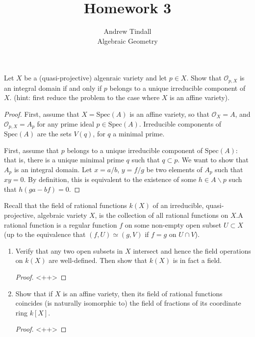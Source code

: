 \documentclass[12pt]{article}
\theoremstyle{definition}
\newenvironment{problem}[2][Problem]{\begin{trivlist}
\item[\hskip \labelsep {\bfseries #1}\hskip \labelsep {\bfseries #2.}]}{\end{trivlist}}
\begin{document}
 
 
\title{Homework 3}
\author{Andrew Tindall
\\ Algebraic Geometry}
 
\maketitle
\begin{problem}{1}
	Let $X$ be a (quasi-projective) algenraic variety and let $p \in X$. Show that $\mathcal{O}_{p,X}$ is an integral domain if and only if $p$ belongs to a unique irreducible component of $X$. (hint: first reduce the problem to the case where $X$ is an affine variety).
	\begin{proof}
		First, assume that $X = \text{Spec}(A)$ is an affine variety, so that $\mathcal O_{X}= A$, and $\mathcal O_{p, X} = A_p$ for any prime ideal $p \in \text{Spec}(A)$. Irreducible components of $\text{Spec}(A)$ are the sets $V(q)$, for $q$ a minimal prime.\\
		\par First, assume that $p$ belongs to a unique irreducible component of $\text{Spec}(A)$: that is, there is a unique minimal prime $q$ such that $q \subset p$. We want to show that $A_p$ is an integral domain. Let $x = a/b$, $y = f/g$ be two elements of $A_p$ such that $xy = 0$. By definition, this is equivalent to the existence of some $h \in A \backslash p$ such that $h(ga - bf) = 0$.
	\end{proof}
\end{problem}
\begin{problem}{2}
	Recall that the field of rational functions $k(X)$ of an irreducible, quasi-projective, algebraic variety $X$, is the collection of all rational functions on $X$.A rational function is a regular function $f$ on some non-empty open subset $U \subset X$ (up to the equivalence that $(f,U) \simeq (g, V)$ if $f = g$ on $U \cap V$).
	\begin{enumerate}[label=(\alph*)]
		\item Verify that any two open subsets in $X$ intersect and hence the field operations on $k(X)$ are well-defined. Then show that $k(X)$ is in fact a field.
			\begin{proof}
				<++>
			\end{proof}
		\item Show that if $X$ is an affine variety, then its field of rational functions coincides (is naturally isomorphic to) the field of fractions of its coordinate ring $k[X]$.
			\begin{proof}
				<++>
			\end{proof}
	\end{enumerate}
\end{problem}
\end{document}
